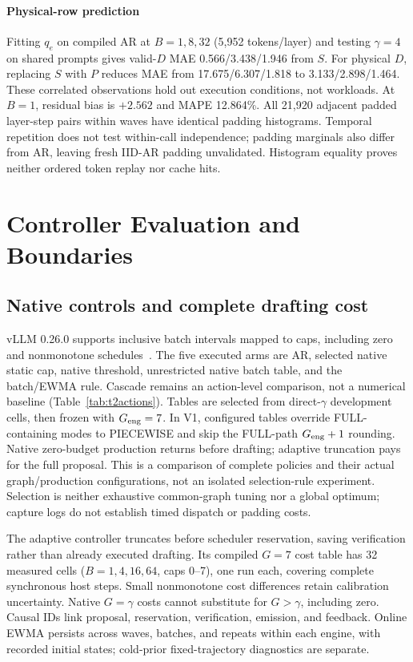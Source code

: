 \documentclass[conference,letterpaper]{IEEEtran}
\begin{document}
\paragraph{Physical-row prediction} Fitting $q_e$ on compiled AR at $B=1,8,32$ (5,952 tokens/layer) and testing $\gamma=4$ on shared prompts gives valid-$D$ MAE 0.566/3.438/1.946 from $S$. For physical $D$, replacing $S$ with $P$ reduces MAE from 17.675/6.307/1.818 to 3.133/2.898/1.464. These correlated observations hold out execution conditions, not workloads. At $B=1$, residual bias is $+2.562$ and MAPE 12.864\%. All 21,920 adjacent padded layer-step pairs within waves have identical padding histograms. Temporal repetition does not test within-call independence; padding marginals also differ from AR, leaving fresh IID-AR padding unvalidated. Histogram equality proves neither ordered token replay nor cache hits.


\section{Controller Evaluation and Boundaries}\label{sec:controller}
\subsection{Native controls and complete drafting cost}\label{sec:native}
vLLM 0.26.0 supports inclusive batch intervals mapped to caps, including zero and nonmonotone schedules~\cite{vllmdynamic,vllmconfig}. The five executed arms are AR, selected native static cap, native threshold, unrestricted native batch table, and the batch/EWMA rule. Cascade remains an action-level comparison, not a numerical baseline (Table~\ref{tab:t2actions}). Tables are selected from direct-$\gamma$ development cells, then frozen with $G_{\rm eng}=7$. In V1, configured tables override FULL-containing modes to PIECEWISE and skip the FULL-path $G_{\rm eng}+1$ rounding. Native zero-budget production returns before drafting; adaptive truncation pays for the full proposal. This is a comparison of complete policies and their actual graph/production configurations, not an isolated selection-rule experiment. Selection is neither exhaustive common-graph tuning nor a global optimum; capture logs do not establish timed dispatch or padding costs.

The adaptive controller truncates before scheduler reservation, saving verification rather than already executed drafting. Its compiled $G=7$ cost table has 32 measured cells ($B=1,4,16,64$, caps 0--7), one run each, covering complete synchronous host steps. Small nonmonotone cost differences retain calibration uncertainty. Native $G=\gamma$ costs cannot substitute for $G>\gamma$, including zero. Causal IDs link proposal, reservation, verification, emission, and feedback. Online EWMA persists across waves, batches, and repeats within each engine, with recorded initial states; cold-prior fixed-trajectory diagnostics are separate.
\end{document}
